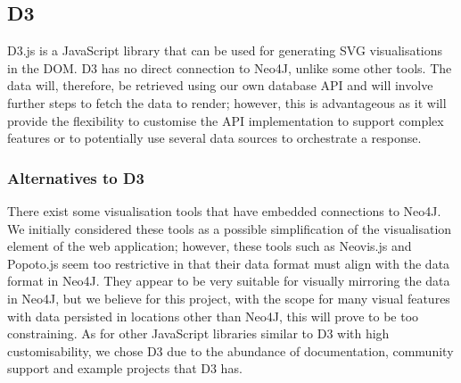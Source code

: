 \subsection{D3}
D3.js is a JavaScript library that can be used for generating SVG visualisations in the DOM. D3 has no direct connection to Neo4J, unlike some other tools. The data will, therefore, be retrieved using our own database API and will involve further steps to fetch the data to render; however, this is advantageous as it will provide the flexibility to customise the API implementation to support complex features or to potentially use several data sources to orchestrate a response. 

\subsubsection{Alternatives to D3}
There exist some visualisation tools that have embedded connections to Neo4J. We initially considered these tools as a possible simplification of the visualisation element of the web application; however, these tools such as Neovis.js and Popoto.js seem too restrictive in that their data format must align with the data format in Neo4J. They appear to be very suitable for visually mirroring the data in Neo4J, but we believe for this project, with the scope for many visual features with data persisted in locations other than Neo4J, this will prove to be too constraining. As for other JavaScript libraries similar to D3 with high customisability, we chose D3 due to the abundance of documentation, community support and example projects that D3 has. 

